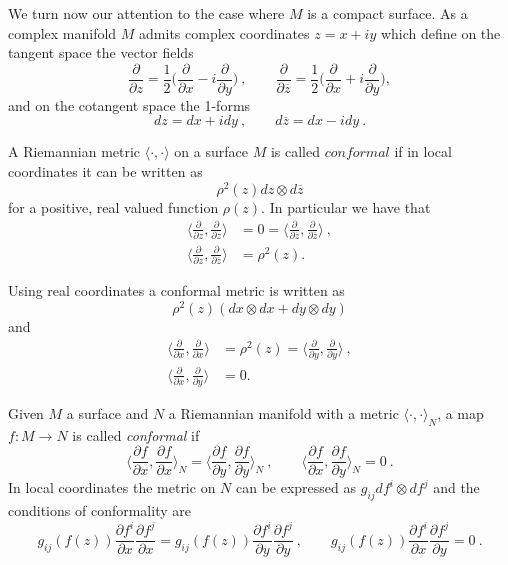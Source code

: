 We turn now our attention to the case where $M$ is a compact surface. As a complex manifold $M$ admits complex coordinates $z=x + iy$ which define on the tangent space the vector fields
\[
\frac{\partial}{\partial z} = \frac{1}{2} \Big(\frac{\partial}{\partial x} -i \frac{\partial}{\partial y} \Big) \ , \qquad \frac{\partial}{\partial \overline{z}} = \frac{1}{2} \Big(\frac{\partial}{\partial x} + i \frac{\partial}{\partial y} \Big) ,
\]
and on the cotangent space the 1-forms
\[
dz = dx + idy \ , \qquad d\overline{z} = dx - idy \ .
\]
\begin{definition}
    A Riemannian metric $\langle \cdot , \cdot \rangle$ on a surface $M$ is called $\textit{conformal}$ if in local coordinates it can be written as
    \[
        \rho^2(z) dz \otimes d\overline{z}
    \]
    for a positive, real valued function $\rho(z)$. In particular we have that
    \[
    \begin{split}
        \Big\langle \frac{\partial}{\partial z}, \frac{\partial}{\partial z} \Big\rangle & = 0 = \Big\langle \frac{\partial}{\partial \overline{z}}, \frac{\partial}{\partial \overline{z}} \Big\rangle \ , \\
         \Big\langle \frac{\partial}{\partial z}, \frac{\partial}{\partial \overline{z}} \Big\rangle & = \rho^2(z).
    \end{split}
    \]
\end{definition}
\begin{observation}
    Using real coordinates a conformal metric is written as 
    \[
        \rho^2(z) (dx \otimes dx + dy \otimes dy)
    \]
    and
    \[
    \begin{split}
        \Big\langle \frac{\partial}{\partial x}, \frac{\partial}{\partial x} \Big\rangle & = \rho^2(z) = \Big\langle \frac{\partial}{\partial y}, \frac{\partial}{\partial y} \Big\rangle \ , \\
         \Big\langle \frac{\partial}{\partial x}, \frac{\partial}{\partial y} \Big\rangle & = 0.
    \end{split}
    \]
\end{observation}
\red{------}
\begin{definition}
    Given $M$ a surface and $N$ a Riemannian manifold with a metric $\langle \cdot , \cdot \rangle_N$, a map $f:M \to N$ is called \textit{conformal} if
    \[
    \Big\langle \frac{\partial f}{\partial x}, \frac{\partial f}{\partial x} \Big\rangle_N = \Big\langle \frac{\partial f}{\partial y}, \frac{\partial f}{\partial y} \Big\rangle_N \ , \qquad \Big\langle \frac{\partial f}{\partial x}, \frac{\partial f}{\partial y} \Big\rangle_N = 0 \ .
    \]
    In local coordinates the metric on $N$ can be expressed as $g_{ij}df^i \otimes df^j$ and the conditions of conformality are
    \[
    g_{ij}(f(z)) \frac{\partial f^i}{\partial x} \frac{\partial f^j}{\partial x} = g_{ij}(f(z)) \frac{\partial f^i}{\partial y} \frac{\partial f^j}{\partial y} \ , \qquad g_{ij}(f(z)) \frac{\partial f^i}{\partial x} \frac{\partial f^j}{\partial y} = 0 \ .
    \]
\end{definition}

